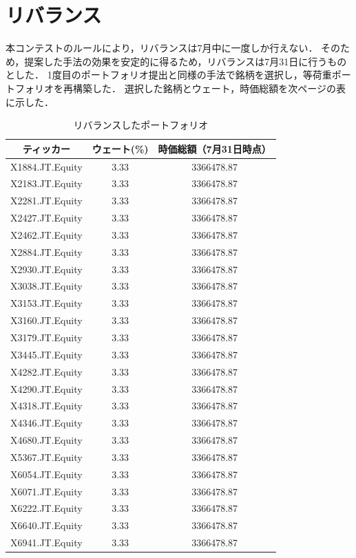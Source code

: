 ﻿\documentclass[11pt]{jreport}
\begin{document}
\section{リバランス}
本コンテストのルールにより，リバランスは7月中に一度しか行えない．
そのため，提案した手法の効果を安定的に得るため，リバランスは7月31日に行うものとした．
1度目のポートフォリオ提出と同様の手法で銘柄を選択し，等荷重ポートフォリオを再構築した．
選択した銘柄とウェート，時価総額を次ページの表に示した．
\begin{table}[htbp]
\caption{リバランスしたポートフォリオ}
\begin{center}
\begin{tabular}{|c|c|c|}
\hline
ティッカー & ウェート(\%) & 時価総額（7月31日時点）\\
\hline
\hline
X1884.JT.Equity & 3.33 & 3366478.87\\
X2183.JT.Equity & 3.33 & 3366478.87\\
X2281.JT.Equity & 3.33 & 3366478.87\\
X2427.JT.Equity & 3.33 & 3366478.87\\
X2462.JT.Equity & 3.33 & 3366478.87\\
X2884.JT.Equity & 3.33 & 3366478.87\\
X2930.JT.Equity & 3.33 & 3366478.87\\
X3038.JT.Equity & 3.33 & 3366478.87\\
X3153.JT.Equity & 3.33 & 3366478.87\\
X3160.JT.Equity & 3.33 & 3366478.87\\
X3179.JT.Equity & 3.33 & 3366478.87\\
X3445.JT.Equity & 3.33 & 3366478.87\\
X4282.JT.Equity & 3.33 & 3366478.87\\
X4290.JT.Equity & 3.33 & 3366478.87\\
X4318.JT.Equity & 3.33 & 3366478.87\\
X4346.JT.Equity & 3.33 & 3366478.87\\
X4680.JT.Equity & 3.33 & 3366478.87\\
X5367.JT.Equity & 3.33 & 3366478.87\\
X6054.JT.Equity & 3.33 & 3366478.87\\
X6071.JT.Equity & 3.33 & 3366478.87\\
X6222.JT.Equity & 3.33 & 3366478.87\\
X6640.JT.Equity & 3.33 & 3366478.87\\
X6941.JT.Equity & 3.33 & 3366478.87\\

\end{tabular}
\end{center}
\end{table}
\end{document}
